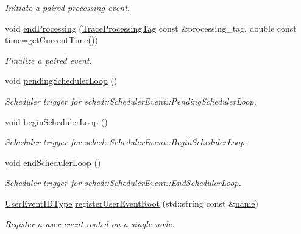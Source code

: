 \begin{DoxyCompactItemize}
\begin{DoxyCompactList}\small\item\em Initiate a paired processing event. \end{DoxyCompactList}\item 
void \hyperlink{structvt_1_1trace_1_1_trace_a18f66e844acc133fce37c2c9d9f939e0}{end\+Processing} (\hyperlink{structvt_1_1trace_1_1_trace_processing_tag}{Trace\+Processing\+Tag} const \&processing\+\_\+tag, double const time=\hyperlink{structvt_1_1trace_1_1_trace_lite_ad1d8159d645a3b7047ce3f2e0c080f8d}{get\+Current\+Time}())
\begin{DoxyCompactList}\small\item\em Finalize a paired event. \end{DoxyCompactList}\item 
void \hyperlink{structvt_1_1trace_1_1_trace_a5552347220b63160248f1ff5f14845f3}{pending\+Scheduler\+Loop} ()
\begin{DoxyCompactList}\small\item\em Scheduler trigger for {\ttfamily sched\+::\+Scheduler\+Event\+::\+Pending\+Scheduler\+Loop}. \end{DoxyCompactList}\item 
void \hyperlink{structvt_1_1trace_1_1_trace_a0e6566503861138843e7dc0a9ba30180}{begin\+Scheduler\+Loop} ()
\begin{DoxyCompactList}\small\item\em Scheduler trigger for {\ttfamily sched\+::\+Scheduler\+Event\+::\+Begin\+Scheduler\+Loop}. \end{DoxyCompactList}\item 
void \hyperlink{structvt_1_1trace_1_1_trace_ad7ee4fc8c75874a524ce7cc1501209fd}{end\+Scheduler\+Loop} ()
\begin{DoxyCompactList}\small\item\em Scheduler trigger for {\ttfamily sched\+::\+Scheduler\+Event\+::\+End\+Scheduler\+Loop}. \end{DoxyCompactList}\item 
\hyperlink{namespacevt_1_1trace_a5908920d051c144c89f17c69ed262350}{User\+Event\+I\+D\+Type} \hyperlink{structvt_1_1trace_1_1_trace_a99fcca49a5506c3ee5cda67e541e37cc}{register\+User\+Event\+Root} (std\+::string const \&\hyperlink{structvt_1_1trace_1_1_trace_aaae4bbf6d009229a5c8b9db67a127942}{name})
\begin{DoxyCompactList}\small\item\em Register a user event rooted on a single node. \end{DoxyCompactList}\item 

\end{DoxyCompactItemize}
